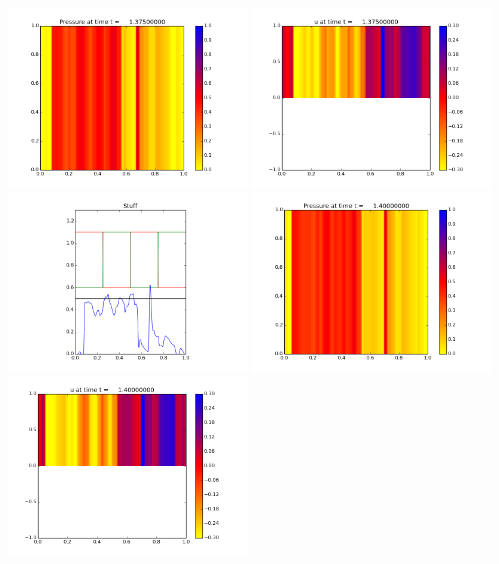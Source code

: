 \documentclass[11pt]{article}
\begin{document}
\vskip 10pt 
\includegraphics[width=0.475\textwidth]{frame0055fig0.png}
\includegraphics[width=0.475\textwidth]{frame0055fig1.png}
\vskip 10pt 
\includegraphics[width=0.475\textwidth]{frame0055fig3.png}
\vskip 10pt 
\includegraphics[width=0.475\textwidth]{frame0056fig0.png}
\includegraphics[width=0.475\textwidth]{frame0056fig1.png}
\end{document}
